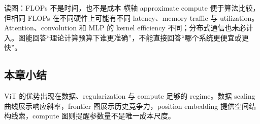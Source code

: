 
\begin{knowledgebox}{读图：FLOPs 不是时间，也不是成本}
横轴 approximate compute 便于算法比较，但相同 FLOPs 在不同硬件上可能有不同 latency、memory traffic 与 utilization。Attention、convolution 和 MLP 的 kernel efficiency 不同；分布式通信也未必计入。图能回答“理论计算预算下谁更准确”，不能直接回答“哪个系统更便宜或更快”。
\end{knowledgebox}

\subsection{本章小结}

ViT 的优势出现在数据、regularization 与 compute 足够的 regime。数据 scaling 曲线展示响应斜率，frontier 图展示历史竞争力，position embedding 提供空间结构线索，compute 图则提醒参数量不是唯一成本尺度。

